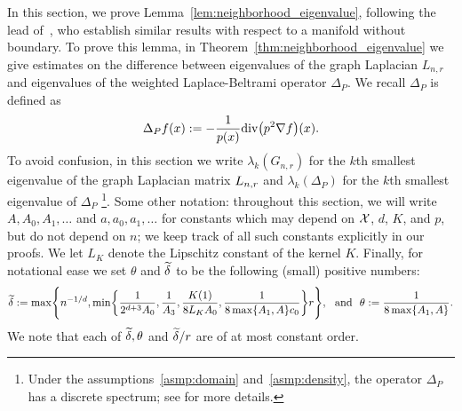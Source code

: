 In this section, we prove Lemma~\ref{lem:neighborhood_eigenvalue}, following the lead of~\citet{burago2014,trillos2019,calder2019}, who establish similar results with respect to a manifold without boundary. To prove this lemma, in  Theorem~\ref{thm:neighborhood_eigenvalue} we give estimates on the difference between eigenvalues of the graph Laplacian $L_{n,r}$ and eigenvalues of the weighted Laplace-Beltrami operator $\Delta_P$. We recall $\Delta_P$ is defined as
\begin{equation*}
\Delta_Pf(x) := -\frac{1}{p(x)} \mathrm{div}\bigl(p^2\nabla f\bigr)(x).
\end{equation*}
To avoid confusion, in this section we write $\lambda_k(G_{n,r})$ for the $k$th smallest eigenvalue of the graph Laplacian matrix $L_{n,r}$ and $\lambda_k(\Delta_P)$ for the $k$th smallest eigenvalue of $\Delta_P$ \footnote{Under the assumptions~\ref{asmp:domain} and~\ref{asmp:density}, the operator $\Delta_P$ has a discrete spectrum; see \citet{garciatrillos18}  for more details.}. Some other notation: throughout this section, we will write $A, A_0, A_1,\ldots$ and $a,a_0,a_1,\ldots$ for constants which may depend on $\mathcal{X}$, $d$, $K$, and $p$, but do not depend on $n$; we keep track of all such constants explicitly in our proofs. We let $L_K$ denote the Lipschitz constant of the kernel $K$. Finally, for notational ease we set $\theta$ and $\widetilde{\delta}$ to be the following (small) positive numbers:
\begin{equation}
\label{asmp:smallness}
\widetilde{\delta} := \max\Biggl\{n^{-1/d}, \min\biggl\{\frac{1}{2^{d + 3}A_0}, \frac{1}{A_3}, \frac{K(1)}{8L_KA_0}, \frac{1}{8\max\{A_1,A\}c_0}\biggr\}r\Biggr\},~~\textrm{and}~~
\theta := \frac{1}{8\max\{A_1,A\}}.
\end{equation} 
We note that each of $\widetilde{\delta}, \theta$ and $\widetilde{\delta}/r$ are of at most constant order. 

